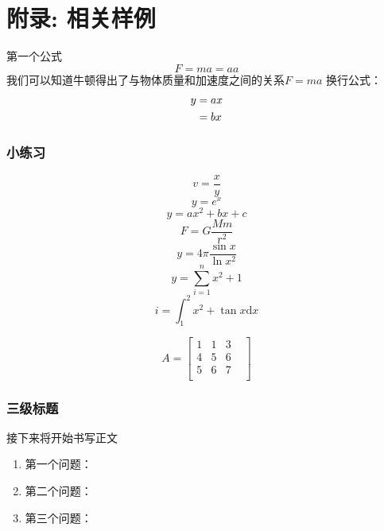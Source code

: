 \documentclass[UTF8]{ctexart}
\begin{document}
	\section{附录: 相关样例}
	第一个公式
	\begin{equation}
		F=ma=aa
	\end{equation}
	我们可以知道牛顿得出了与物体质量和加速度之间的关系$F=ma$
	换行公式：
	\begin{align}
		y &=ax\notag\\
		&=bx
	\end{align}
	
	\subsubsection{小练习}
	\begin{equation}
		v=\frac{x}{y}
	\end{equation}
	\begin{equation}
		y=e^{x}
	\end{equation}
	\begin{equation}
		y=ax^2+bx+c
	\end{equation}
	\begin{equation}
		F=G\frac{Mm}{r^2}
	\end{equation}
	\begin{equation}
		y=4\pi \frac{\sin{x}}{\ln{x^2}}
	\end{equation}
	\begin{equation}
		y=\sum^{n}_{i=1} x^2+1
	\end{equation}
	\begin{equation}
		i=\int_{1}^{2}x^2+\tan{x}\mathrm{d}x
	\end{equation}
	
	\begin{equation}
		A=\begin{bmatrix}
			1&1&3\\4&5&6\\5&6&7&\\
		\end{bmatrix}
	\end{equation}
	\subsubsection{三级标题}
	
	接下来将开始书写正文
	\begin{enumerate}
		\item 第一个问题：
		\item 第二个问题：
		\item 第三个问题：
	\end{enumerate}
	
\end{document}
